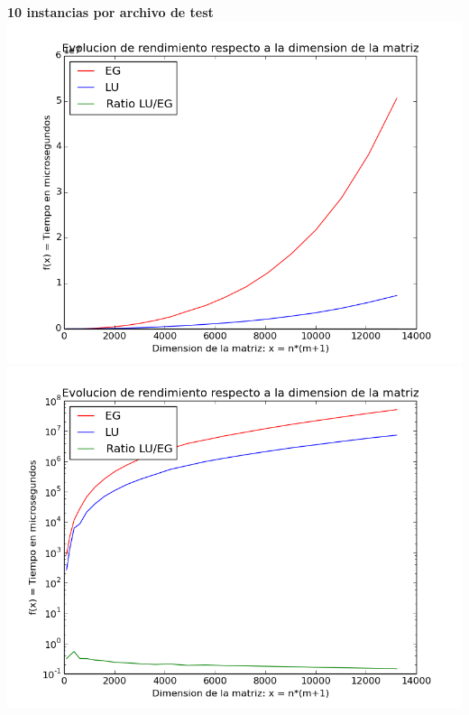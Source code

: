 \begin{center}
\textbf{10 instancias por archivo de test}\\
\includegraphics[scale=0.35]{experimentos2a_2b/gauss_vs_lu_10_inst/gauss_vs_lu_time_consumed_abs.png}
\includegraphics[scale=0.35]{experimentos2a_2b/gauss_vs_lu_10_inst/gauss_vs_lu_time_consumed_log.png}
\end{center}

